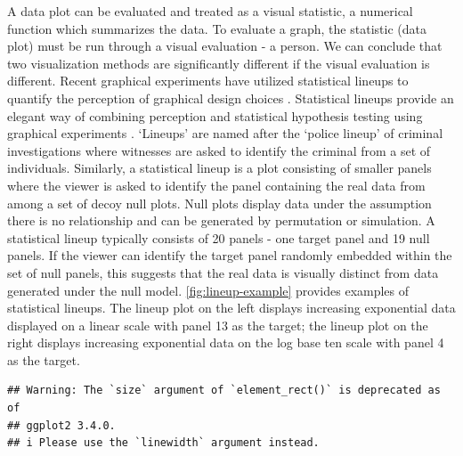 \documentclass[12pt]{article}
\begin{document}
A data plot can be evaluated and treated as a visual statistic, a
numerical function which summarizes the data. To evaluate a graph, the
statistic (data plot) must be run through a visual evaluation - a
person. We can conclude that two visualization methods are significantly
different if the visual evaluation is different. Recent graphical
experiments have utilized statistical lineups to quantify the perception
of graphical design choices
\citep{hofmann_graphical_2012, loy_model_2017, loy_variations_2016, vanderplas_clusters_2017}.
Statistical lineups provide an elegant way of combining perception and
statistical hypothesis testing using graphical experiments
\citep{majumder_validation_2013, vanderplas_testing_2020, wickham2010graphical}.
`Lineups' are named after the `police lineup' of criminal investigations
where witnesses are asked to identify the criminal from a set of
individuals. Similarly, a statistical lineup is a plot consisting of
smaller panels where the viewer is asked to identify the panel
containing the real data from among a set of decoy null plots. Null
plots display data under the assumption there is no relationship and can
be generated by permutation or simulation. A statistical lineup
typically consists of 20 panels - one target panel and 19 null panels.
If the viewer can identify the target panel randomly embedded within the
set of null panels, this suggests that the real data is visually
distinct from data generated under the null model.
\cref{fig:lineup-example} provides examples of statistical lineups. The
lineup plot on the left displays increasing exponential data displayed
on a linear scale with panel 13 as the target; the lineup plot on the
right displays increasing exponential data on the log base ten scale
with panel 4 as the target.

\begin{verbatim}
## Warning: The `size` argument of `element_rect()` is deprecated as of
## ggplot2 3.4.0.
## i Please use the `linewidth` argument instead.
\end{verbatim}
\end{document}
